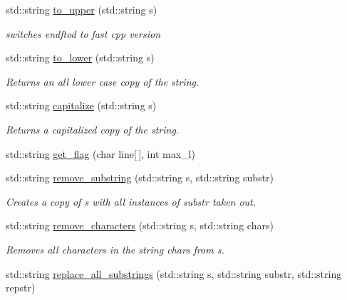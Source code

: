 \begin{DoxyCompactItemize}
\item 
std\+::string \hyperlink{namespacepyne_aa02f7d3ceda305d11379f2f778e4d645}{to\+\_\+upper} (std\+::string s)
\begin{DoxyCompactList}\small\item\em switches endftod to fast cpp version \end{DoxyCompactList}\item 
std\+::string \hyperlink{namespacepyne_ad694bbfebcefbdb2839ed156ab216abc}{to\+\_\+lower} (std\+::string s)\hypertarget{namespacepyne_ad694bbfebcefbdb2839ed156ab216abc}{}\label{namespacepyne_ad694bbfebcefbdb2839ed156ab216abc}

\begin{DoxyCompactList}\small\item\em Returns an all lower case copy of the string. \end{DoxyCompactList}\item 
std\+::string \hyperlink{namespacepyne_a8855d064ba8f0c3ab7b85aa9788c9673}{capitalize} (std\+::string s)\hypertarget{namespacepyne_a8855d064ba8f0c3ab7b85aa9788c9673}{}\label{namespacepyne_a8855d064ba8f0c3ab7b85aa9788c9673}

\begin{DoxyCompactList}\small\item\em Returns a capitalized copy of the string. \end{DoxyCompactList}\item 
std\+::string \hyperlink{namespacepyne_ab883f7c602f63e87fae5c2f48cfed0f8}{get\+\_\+flag} (char line\mbox{[}$\,$\mbox{]}, int max\+\_\+l)
\item 
std\+::string \hyperlink{namespacepyne_adf03d1957dc2420ef99554c6fe4c4ec0}{remove\+\_\+substring} (std\+::string s, std\+::string substr)\hypertarget{namespacepyne_adf03d1957dc2420ef99554c6fe4c4ec0}{}\label{namespacepyne_adf03d1957dc2420ef99554c6fe4c4ec0}

\begin{DoxyCompactList}\small\item\em Creates a copy of {\itshape s} with all instances of {\itshape substr} taken out. \end{DoxyCompactList}\item 
std\+::string \hyperlink{namespacepyne_ae6154cc77d52eaeb50b1e35f043c1070}{remove\+\_\+characters} (std\+::string s, std\+::string chars)\hypertarget{namespacepyne_ae6154cc77d52eaeb50b1e35f043c1070}{}\label{namespacepyne_ae6154cc77d52eaeb50b1e35f043c1070}

\begin{DoxyCompactList}\small\item\em Removes all characters in the string {\itshape chars} from {\itshape s}. \end{DoxyCompactList}\item 
std\+::string \hyperlink{namespacepyne_a181f9781cb5da2ca18b1946792996268}{replace\+\_\+all\+\_\+substrings} (std\+::string s, std\+::string substr, std\+::string repstr)\hypertarget{namespacepyne_a181f9781cb5da2ca18b1946792996268}{}\label{namespacepyne_a181f9781cb5da2ca18b1946792996268}


\end{DoxyCompactItemize}
